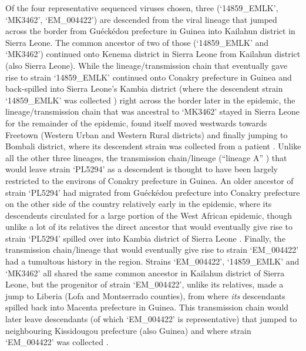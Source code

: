 \documentclass{bmcart}
\begin{document}
Of the four representative sequenced viruses chosen, three (`14859\_EMLK', `MK3462', `EM\_004422') are descended from the viral lineage that jumped across the border from Gu\'{e}ck\'{e}dou prefecture in Guinea into Kailahun district in Sierra Leone.
The common ancestor of two of those (`14859\_EMLK' and `MK3462') continued onto Kenema district in Sierra Leone from Kailahun district (also Sierra Leone).
While the lineage/transmission chain that eventually gave rise to strain `14859\_EMLK' continued onto Conakry prefecture in Guinea and back-spilled into Sierra Leone's Kambia district (where the descendent strain `14859\_EMLK' was collected \cite{arias_rapid_2016}) right across the border later in the epidemic, the lineage/transmission chain that was ancestral to `MK3462' stayed in Sierra Leone for the remainder of the epidemic, found itself moved westwards towards Freetown (Western Urban and Western Rural districts) and finally jumping to Bombali district, where its descendent strain was collected from a patient \cite{arias_rapid_2016}.
Unlike all the other three lineages, the transmission chain/lineage (``lineage A'' \cite{carroll_temporal_2015}) that would leave strain `PL5294' as a descendent is thought to have been largely restricted to the environs of Conakry prefecture in Guinea.
An older ancestor of strain `PL5294' had migrated from Gu\'{e}ck\'{e}dou prefecture into Conakry prefecture on the other side of the country relatively early in the epidemic, where its descendents circulated for a large portion of the West African epidemic, though unlike a lot of its relatives the direct ancestor that would eventually give rise to strain `PL5294' spilled over into Kambia district of Sierra Leone \cite{arias_rapid_2016}.
Finally, the transmission chain/lineage that would eventually give rise to strain `EM\_004422' had a tumultous history in the region.
Strains `EM\_004422', `14859\_EMLK' and `MK3462' all shared the same common ancestor in Kailahun district of Sierra Leone, but the progenitor of strain `EM\_004422', unlike its relatives, made a jump to Liberia (Lofa and Montserrado counties), from where \textit{its} descendants spilled back into Macenta prefecture in Guinea.
This transmission chain would later leave descendants (of which `EM\_004422' is representative) that jumped to neighbouring Kissidougou prefecture (also Guinea) and where strain `EM\_004422' was collected \cite{carroll_temporal_2015}.
\end{document}
